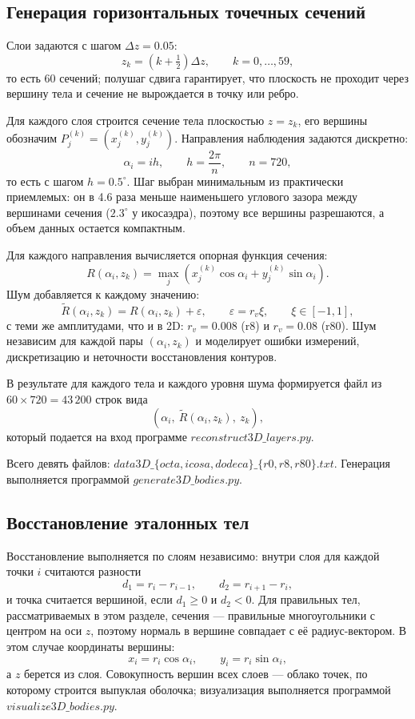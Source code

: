 \documentclass[12pt, a4paper]{article}
\begin{document}
\subsection{Генерация горизонтальных точечных сечений}

Слои задаются с шагом $\Delta z = 0.05$:
\[
z_k=\left(k+\tfrac12\right)\Delta z,\qquad k=0,\dots,59,
\]
то есть 60 сечений; полушаг сдвига гарантирует, что плоскость не проходит через вершину тела и сечение не вырождается в точку или ребро.

Для каждого слоя строится сечение тела плоскостью $z=z_k$, его вершины обозначим $P_j^{(k)}=(x_j^{(k)},y_j^{(k)})$. Направления наблюдения задаются дискретно:
\[
\alpha_i=i h,\qquad h=\frac{2\pi}{n},\qquad n=720,
\]
то есть с шагом $h=0.5^\circ$. Шаг выбран минимальным из практически приемлемых: он в 4.6 раза меньше наименьшего углового зазора между вершинами сечения ($2.3^\circ$ у икосаэдра), поэтому все вершины разрешаются, а объем данных остается компактным.

Для каждого направления вычисляется опорная функция сечения:
\[
R(\alpha_i,z_k)=\max_j\left(x_j^{(k)}\cos\alpha_i+y_j^{(k)}\sin\alpha_i\right).
\]
Шум добавляется к каждому значению:
\[
\widetilde R(\alpha_i,z_k)=R(\alpha_i,z_k)+\varepsilon,\qquad
\varepsilon=r_v\xi,\qquad \xi\in[-1,1],
\]
с теми же амплитудами, что и в 2D: $r_v=0.008$ (r8) и $r_v=0.08$ (r80). Шум независим для каждой пары $(\alpha_i,z_k)$ и моделирует ошибки измерений, дискретизацию и неточности восстановления контуров.

\begin{raggedright}
В результате для каждого тела и каждого уровня шума формируется файл из $60\times720=43\,200$ строк вида
\[
(\alpha_i,\ \widetilde R(\alpha_i,z_k),\ z_k),
\]
который подается на вход программе $reconstruct3D\_layers.py$.

Всего девять файлов: $data3D\_\{octa,\allowbreak icosa,\allowbreak dodeca\}\_\{r0,\allowbreak r8,\allowbreak r80\}.txt$. Генерация выполняется программой $generate3D\_bodies.py$.
\end{raggedright}

\subsection{Восстановление эталонных тел}

Восстановление выполняется по слоям независимо: внутри слоя для каждой точки $i$ считаются разности
\[
d_1=r_i-r_{i-1},\qquad d_2=r_{i+1}-r_i,
\]
и точка считается вершиной, если $d_1\ge 0$ и $d_2<0$. Для правильных тел, рассматриваемых в этом разделе, сечения --- правильные многоугольники с центром на оси $z$, поэтому нормаль в вершине совпадает с её радиус-вектором. В этом случае координаты вершины:
\[
x_i=r_i\cos\alpha_i,\qquad y_i=r_i\sin\alpha_i,
\]
а $z$ берется из слоя. Совокупность вершин всех слоев --- облако точек, по которому строится выпуклая оболочка; визуализация выполняется программой $visualize3D\_bodies.py$.
\end{document}
